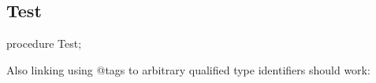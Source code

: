 \documentclass{report}
\newif\ifpdf
\begin{document}
\subsection*{Test}
\fi
\label{ok_type_aliases-Test}
\begin{list}{}{
\setlength{\itemindent}{0cm}
\setlength{\listparindent}{0cm}
\setlength{\leftmargin}{\evensidemargin}
\addtolength{\leftmargin}{\tmplength}
\settowidth{\labelsep}{X}
\addtolength{\leftmargin}{\labelsep}
\setlength{\labelwidth}{\tmplength}
}
\item[\textbf{Declaration}\hfill]
\ifpdf
\begin{flushleft}
\fi
\begin{ttfamily}
procedure Test;\end{ttfamily}

\ifpdf
\end{flushleft}
\fi

\par
\item[\textbf{Description}]
Also linking using @tags to arbitrary qualified type identifiers should work:


\end{list}
\end{document}
